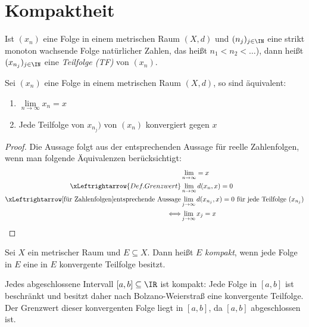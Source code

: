 \section{Kompaktheit}

\begin{Definition}%
	Ist $(x_n)$ eine Folge in einem metrischen Raum $(X,d)$ und $(n_j)_{j \in \IN}$ 
	eine strikt monoton wachsende Folge natürlicher Zahlen, das heißt $n_1 < n_2 
	< \hdots$), dann heißt $(x_{n_j})_{j \in \IN}$ eine \emph{Teilfolge (TF)} von 
	$(x_n)$.
\end{Definition}

\begin{Proposition}\label{vl_25_prop_1}%
	Sei $(x_n)$ eine Folge in einem metrischen Raum $(X,d)$, so sind äquivalent:
	\begin{enumerate}
		\item \label{vl_25_stp_1}$\lim\limits_{n \rightarrow \infty}{x_n} = x$
		\item \label{vl_25_stp_2} Jede Teilfolge von $x_{n_j})$ von $(x_n)$ 
			konvergiert gegen $x$
	\end{enumerate}
\end{Proposition}

\begin{proof}
	Die Aussage folgt aus der entsprechenden Aussage für reelle Zahlenfolgen, wenn 
	man folgende Äquivalenzen berücksichtigt:
	\begin{align*}
		&\lim\limits_{n \rightarrow \infty} = x \\
		\xLeftrightarrow{Def. Grenzwert} &
			\lim\limits_{n\rightarrow\infty}d(x_n,x)=0 \\
		\xLeftrightarrow[\text{für Zahlenfolgen}]{\text{entsprechende Aussage}} 
			& \lim\limits_{j\rightarrow \infty}d(x_{n_j},x) = 0 
			\text{ für jede Teilfolge } (x_{n_j}) \\
		\Longleftrightarrow & \lim\limits_{j \rightarrow \infty} x_j = x
	\end{align*}
\end{proof}

\begin{Definition}%
	Sei $X$ ein metrischer Raum und $E \subseteq X$. Dann heißt $E$ \emph{kompakt}, 
	wenn jede Folge in $E$ eine in $E$ konvergente Teilfolge besitzt.
\end{Definition}

\begin{Beispiel}	
	Jedes abgeschlossene Intervall $[a,b] \subseteq \IR$ ist kompakt: 
	Jede Folge in $[a,b]$ ist beschränkt und besitzt daher nach Bolzano-Weierstraß 
	eine konvergente Teilfolge. Der Grenzwert dieser konvergenten Folge liegt in 
	$[a,b]$, da $[a,b]$ abgeschlossen ist.
\end{Beispiel}
 
